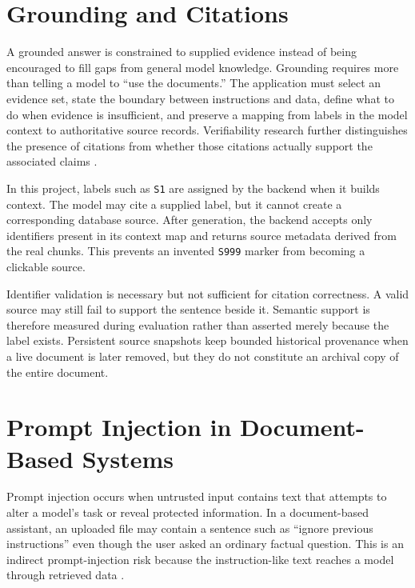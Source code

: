 \section{Grounding and Citations}
\label{sec:background-grounding}

A grounded answer is constrained to supplied evidence instead of being encouraged to fill gaps from general model knowledge. Grounding requires more than telling a model to ``use the documents.'' The application must select an evidence set, state the boundary between instructions and data, define what to do when evidence is insufficient, and preserve a mapping from labels in the model context to authoritative source records. Verifiability research further distinguishes the presence of citations from whether those citations actually support the associated claims \cite{Liu2023Verifiability}.

In this project, labels such as \texttt{S1} are assigned by the backend when it builds context. The model may cite a supplied label, but it cannot create a corresponding database source. After generation, the backend accepts only identifiers present in its context map and returns source metadata derived from the real chunks. This prevents an invented \texttt{S999} marker from becoming a clickable source.

Identifier validation is necessary but not sufficient for citation correctness. A valid source may still fail to support the sentence beside it. Semantic support is therefore measured during evaluation rather than asserted merely because the label exists. Persistent source snapshots keep bounded historical provenance when a live document is later removed, but they do not constitute an archival copy of the entire document.

\section{Prompt Injection in Document-Based Systems}
\label{sec:background-prompt-injection}

Prompt injection occurs when untrusted input contains text that attempts to alter a model's task or reveal protected information. In a document-based assistant, an uploaded file may contain a sentence such as ``ignore previous instructions'' even though the user asked an ordinary factual question. This is an indirect prompt-injection risk because the instruction-like text reaches a model through retrieved data \cite{Abdelnabi2023IndirectPromptInjection,OWASPPromptInjection}.

